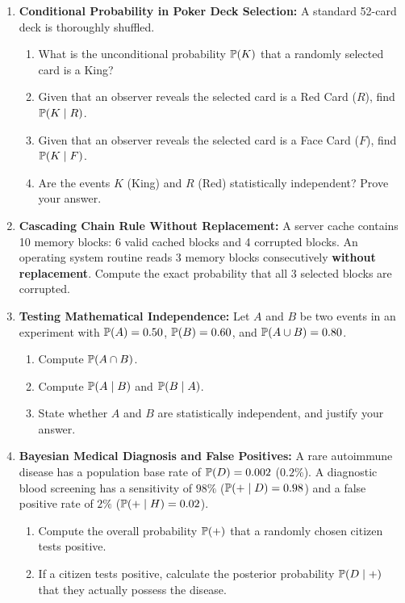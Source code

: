 \begin{enumerate}
    \item \textbf{Conditional Probability in Poker Deck Selection:} A standard 52-card deck is thoroughly shuffled.
    \begin{enumerate}
        \item What is the unconditional probability $\P(K)$ that a randomly selected card is a King?
        \item Given that an observer reveals the selected card is a Red Card ($R$), find $\P(K \mid R)$.
        \item Given that an observer reveals the selected card is a Face Card ($F$), find $\P(K \mid F)$.
        \item Are the events $K$ (King) and $R$ (Red) statistically independent? Prove your answer.
    \end{enumerate}

    \item \textbf{Cascading Chain Rule Without Replacement:} A server cache contains 10 memory blocks: 6 valid cached blocks and 4 corrupted blocks. An operating system routine reads 3 memory blocks consecutively \textbf{without replacement}. Compute the exact probability that all 3 selected blocks are corrupted.

    \item \textbf{Testing Mathematical Independence:} Let $A$ and $B$ be two events in an experiment with $\P(A) = 0.50$, $\P(B) = 0.60$, and $\P(A \cup B) = 0.80$.
    \begin{enumerate}
        \item Compute $\P(A \cap B)$.
        \item Compute $\P(A \mid B)$ and $\P(B \mid A)$.
        \item State whether $A$ and $B$ are statistically independent, and justify your answer.
    \end{enumerate}

    \item \textbf{Bayesian Medical Diagnosis and False Positives:} A rare autoimmune disease has a population base rate of $\P(D) = 0.002$ ($0.2\%$). A diagnostic blood screening has a sensitivity of $98\%$ ($\P(+ \mid D) = 0.98$) and a false positive rate of $2\%$ ($\P(+ \mid H) = 0.02$).
    \begin{enumerate}
        \item Compute the overall probability $\P(+)$ that a randomly chosen citizen tests positive.
        \item If a citizen tests positive, calculate the posterior probability $\P(D \mid +)$ that they actually possess the disease.
    \end{enumerate}


\end{enumerate}
